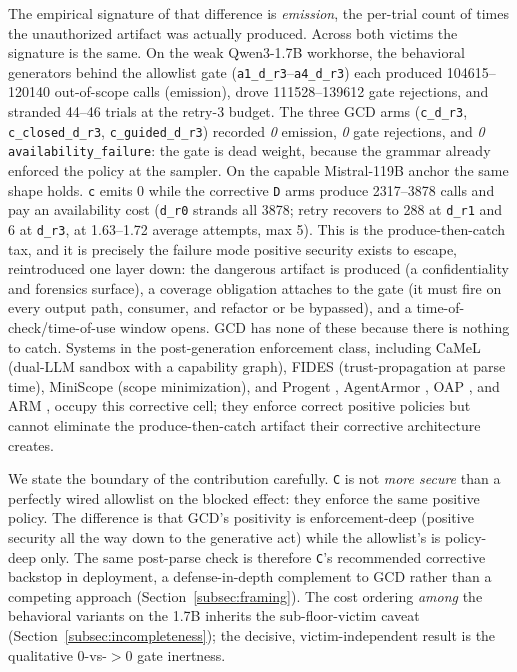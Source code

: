 The empirical signature of that difference is \emph{emission}, the per-trial count of times the unauthorized artifact was actually produced. Across both victims the signature is the same. On the weak Qwen3-1.7B workhorse, the behavioral generators behind the allowlist gate (\texttt{a1\_d\_r3}--\texttt{a4\_d\_r3}) each produced \num{104615}--\num{120140} out-of-scope calls (emission), drove \num{111528}--\num{139612} gate rejections, and stranded 44--46 trials at the retry-3 budget. The three GCD arms (\texttt{c\_d\_r3}, \texttt{c\_closed\_d\_r3}, \texttt{c\_guided\_d\_r3}) recorded \emph{0} emission, \emph{0} gate rejections, and \emph{0} \texttt{availability\_failure}: the gate is dead weight, because the grammar already enforced the policy at the sampler. On the capable Mistral-119B anchor the same shape holds. \texttt{c} emits 0 while the corrective \texttt{D} arms produce \num{2317}--\num{3878} calls and pay an availability cost (\texttt{d\_r0} strands all 3878; retry recovers to 288 at \texttt{d\_r1} and 6 at \texttt{d\_r3}, at \numrange{1.63}{1.72} average attempts, max 5). This is the produce-then-catch tax, and it is precisely the failure mode positive security exists to escape, reintroduced one layer down: the dangerous artifact is produced (a confidentiality and forensics surface), a coverage obligation attaches to the gate (it must fire on every output path, consumer, and refactor or be bypassed), and a time-of-check/time-of-use window opens. GCD has none of these because there is nothing to catch. Systems in the post-generation enforcement class, including CaMeL \cite{camel2025} (dual-LLM sandbox with a capability graph), FIDES \cite{fides2025} (trust-propagation at parse time), MiniScope \cite{miniscope2025} (scope minimization), and Progent \cite{progent2025}, AgentArmor \cite{agentarmor2025}, OAP \cite{oap2026}, and ARM \cite{arm2026}, occupy this corrective cell; they enforce correct positive policies but cannot eliminate the produce-then-catch artifact their corrective architecture creates.

We state the boundary of the contribution carefully. \texttt{C} is not \emph{more secure} than a perfectly wired allowlist on the blocked effect: they enforce the same positive policy. The difference is that GCD's positivity is enforcement-deep (positive security all the way down to the generative act) while the allowlist's is policy-deep only. The same post-parse check is therefore \texttt{C}'s recommended corrective backstop in deployment, a defense-in-depth complement to GCD rather than a competing approach (Section~\ref{subsec:framing}). The cost ordering \emph{among} the behavioral variants on the 1.7B inherits the sub-floor-victim caveat (Section~\ref{subsec:incompleteness}); the decisive, victim-independent result is the qualitative 0-vs-\(>\!0\) gate inertness.

